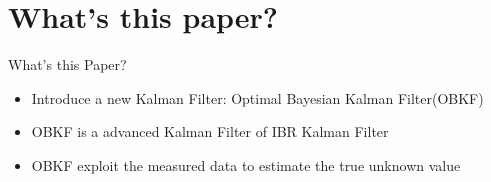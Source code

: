 \section{What's this paper?}
\begin{frame}
    \tableofcontents[currentsection]
\end{frame}

\begin{frame}{What's this Paper?}
\begin{itemize}
    \item Introduce a new Kalman Filter: Optimal Bayesian Kalman Filter(OBKF)\cite{Dehghannasiri2018}
    \item OBKF is a advanced Kalman Filter of IBR Kalman Filter\cite{Dehghannasiri2017}
    \item OBKF exploit the measured data to estimate the true unknown value
\end{itemize}
\end{frame}